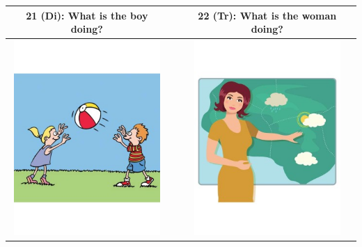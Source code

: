 \begin{tabular}{|c|c|c|}
\hline
21 (Di): What is the boy doing? && 22 (Tr): What is the woman doing? \\
\hline
\includegraphics[width=15em,trim=0 0 0 -3]{figures/I21.jpg} & & \includegraphics[width=15em,trim=0 0 0 -3]{figures/I22.jpg} \\
\hline
\end{tabular}
\vspace{1em} \\


